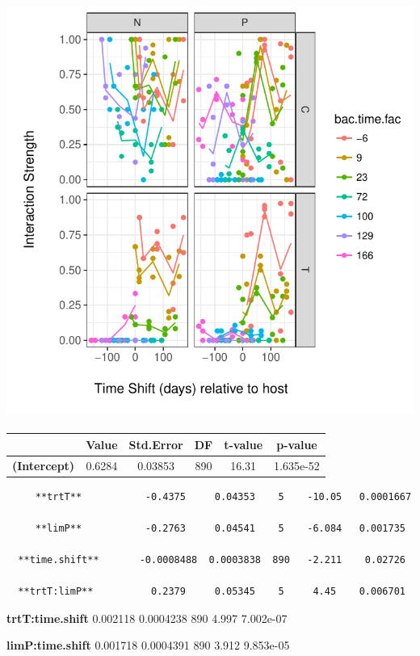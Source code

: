 \documentclass[]{article}
\begin{document}
\subsection{\texorpdfstring{\protect\includegraphics{analysis_ecoevostoich_files/figure-latex/unnamed-chunk-18-1.pdf}}{}}\label{section}

\begin{longtable}[]{@{}cccccc@{}}
\toprule
~ & Value & Std.Error & DF & t-value & p-value\tabularnewline
\midrule
\endhead
\textbf{(Intercept)} & 0.6284 & 0.03853 & 890 & 16.31 &
1.635e-52\tabularnewline
\bottomrule
\end{longtable}

\begin{verbatim}
     **trtT**           -0.4375     0.04353    5    -10.05   0.0001667

     **limP**           -0.2763     0.04541    5    -6.084   0.001735 

  **time.shift**       -0.0008488  0.0003838  890   -2.211    0.02726 

  **trtT:limP**          0.2379     0.05345    5     4.45    0.006701 
\end{verbatim}

\textbf{trtT:time.shift} 0.002118 0.0004238 890 4.997 7.002e-07

\textbf{limP:time.shift} 0.001718 0.0004391 890 3.912 9.853e-05
\end{document}
